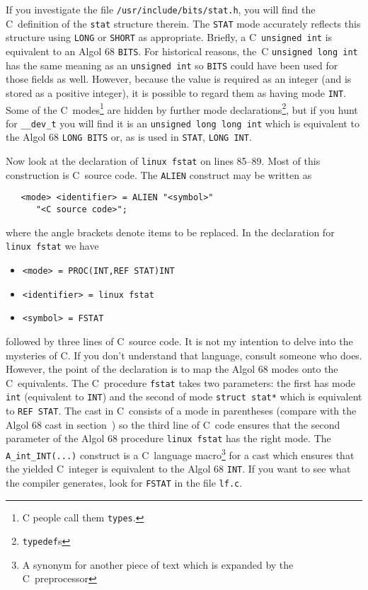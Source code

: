 If you investigate the file \verb|/usr/include/bits/stat.h|, you will
find the C~definition of the \verb|stat| structure therein. The
\verb|STAT| mode accurately reflects this structure using \verb|LONG|
or \verb|SHORT| as appropriate. Briefly, a C~\verb|unsigned int| is
equivalent to an Algol 68 \verb|BITS|. For historical reasons, the~C
\verb|unsigned long int| has the same meaning as an
\verb|unsigned int| so \verb|BITS| could have been used for those
fields as well.  However, because the value is required as an integer
(and is stored as a positive integer), it is possible to regard them
as having mode \verb|INT|. Some of the C~modes\footnote{C people call
them \texttt{types}.} are hidden by further mode
declarations\footnote{\texttt{typedef}s}, but if you hunt for
\verb|__dev_t| you will find it is an \verb|unsigned long long int|
which is equivalent to the Algol 68 \verb|LONG BITS| or, as is used
in \verb|STAT|, \verb|LONG INT|.

Now look at the declaration of \verb|linux fstat| on lines 85--89.
Most of this construction is C~source code. The \verb|ALIEN|
construct may be written as
\begin{verbatim}
   <mode> <identifier> = ALIEN "<symbol>"
      "<C source code>";
\end{verbatim}
\noindent
where the angle brackets denote items to be replaced. In the
declaration for \verb|linux fstat| we have
\begin{itemize}
\item \verb|<mode> = PROC(INT,REF STAT)INT|
\item \verb|<identifier> = linux fstat|
\item \verb|<symbol> = FSTAT|
\end{itemize}
followed by three lines of C~source code. It is not my intention to
delve into the mysteries of C. If you don't understand that language,
consult someone who does. However, the point of the declaration is to
map the Algol 68 modes onto the C~equivalents. The C~procedure
\verb|fstat| takes two parameters: the first has mode \verb|int|
(equivalent to \verb|INT|) and the second of mode \verb|struct stat*|
which is equivalent to \verb|REF STAT|. The cast in C~consists of a
mode in parentheses (compare with the Algol 68 cast in
section~) so the third line of C~code ensures that
the second parameter of the Algol 68 procedure \verb|linux fstat| has
the right mode. The \verb|A_int_INT(...)| construct is a C~language
macro\footnote{A synonym for another piece of text which is expanded
by the C~preprocessor} for a cast which ensures that the yielded
C~integer is equivalent to the Algol 68 \verb|INT|.  If you want to
see what the  compiler
generates, look for \verb|FSTAT| in the file \verb|lf.c|.

